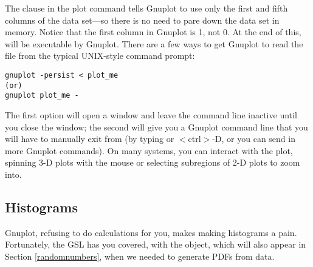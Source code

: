 The clause  in the plot command tells Gnuplot to use
only the first and fifth columns of the data set---so there is no need to pare
down the data set in memory. Notice that the first column in Gnuplot is
1, not 0. At the end of this,  will be executable by
Gnuplot. There are a few ways to get Gnuplot to read the file from the
typical UNIX-style command prompt:
\begin{lstlisting}
gnuplot -persist < plot_me
(or)
gnuplot plot_me -
\end{lstlisting}
The first option will open a window and leave the command line inactive
until you close the window;
the second will give you a Gnuplot command line that you will have to
manually exit
from (by typing  or $<$ctrl$>$-D, or you can send in more
Gnuplot commands). On many systems, you can
interact with the plot, spinning 3-D plots with the mouse or selecting
subregions of 2-D plots to zoom into.

\subsection{Histograms} 
Gnuplot, refusing to do calculations for you,
makes making histograms a pain.  Fortunately, the GSL has you covered,
with the  object, which will also appear
in Section \ref{randomnumbers}, when we needed to generate PDFs from data.

